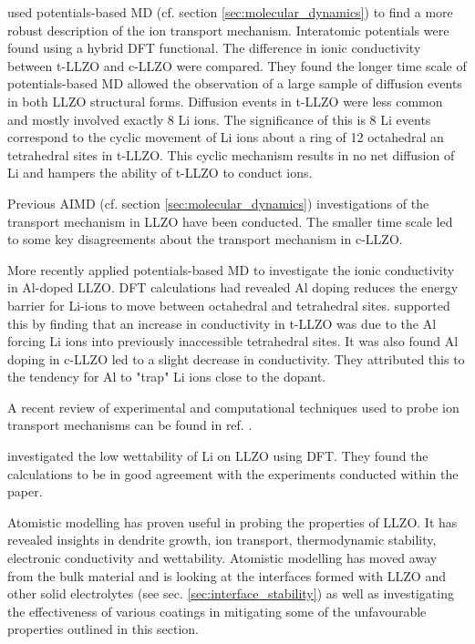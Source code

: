 \documentclass[../main.tex]{subfiles}
\begin{document}
\citeauthor{Burbano2016} used potentials-based MD (cf. section \ref{sec:molecular_dynamics}) to find a more robust description of the ion transport mechanism.\cite{Burbano2016} Interatomic potentials were found using a hybrid DFT functional. The difference in ionic conductivity between t-LLZO and c-LLZO were compared. They found the longer time scale of potentials-based MD allowed the observation of a large sample of diffusion events in both LLZO structural forms. Diffusion events in t-LLZO were less common and mostly involved exactly 8 Li ions. The significance of this is 8 Li events correspond to the cyclic movement of Li ions about a ring of 12 octahedral an tetrahedral sites in t-LLZO. This cyclic mechanism results in no net diffusion of Li and hampers the ability of t-LLZO to conduct ions.

Previous AIMD (cf. section \ref{sec:molecular_dynamics}) investigations of the transport mechanism in LLZO have been conducted. The smaller time scale led to some key disagreements about the transport mechanism in c-LLZO.\cite{Meier2014, Jalem2013, Burbano2016}

More recently \citeauthor{Bonilla2019} applied potentials-based MD to investigate the ionic conductivity in Al-doped LLZO.\cite{Bonilla2019} DFT calculations had revealed Al doping reduces the energy barrier for Li-ions to move between octahedral and tetrahedral sites.\cite{Rettenwander2014, Rettenwander2016} \citeauthor{Bonilla2019} supported this by finding that an increase in conductivity in t-LLZO was due to the Al forcing Li ions into previously inaccessible tetrahedral sites. It was also found Al doping in c-LLZO led to a slight decrease in conductivity. They attributed this to the tendency for Al to "trap" Li ions close to the dopant.

A recent review of experimental and computational techniques used to probe ion transport mechanisms can be found in ref. .

\citeauthor{Sharafi2017} investigated the low wettability of Li on LLZO using DFT.\cite{Sharafi2017} They found the calculations to be in good agreement with the experiments conducted within the paper.

Atomistic modelling has proven useful in probing the properties of LLZO. It has revealed insights in dendrite growth, ion transport, thermodynamic stability, electronic conductivity and wettability. Atomistic modelling has moved away from the bulk material and is looking at the interfaces formed with LLZO and other solid electrolytes (see sec. \ref{sec:interface_stability}) as well as investigating the effectiveness of various coatings in mitigating some of the unfavourable properties outlined in this section. 
\end{document}
